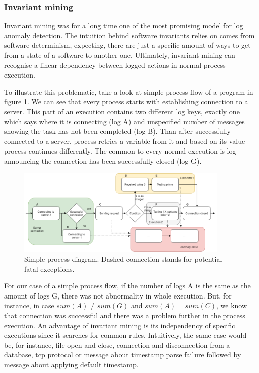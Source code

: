 \subsubsection{Invariant mining}

Invariant mining was for a long time one of the most promising model for log anomaly detection. The intuition behind software invariants relies on comes from software determinism, expecting, there are just a specific amount of ways to get from a state of a software to another one. Ultimately, invariant mining can recognise a linear dependency between logged actions in normal process execution.

To illustrate this problematic, take a look at simple process flow of a program in figure \ref{fig:sota_invMining_simpleProcess}. We can see that every process starts with establishing connection to a server. This part of an execution contains two different log keys, exactly one which says where it is connecting (log A) and unspecified number of messages showing the task has not been completed (log B). Than after successfully connected to a server, process retries a variable from it and based on its value process continues differently. The common to every normal execution is log announcing the connection has been successfully closed (log G).

\begin{figure}[h]
    \centering
    \includegraphics[width=0.9\textwidth]{figures/stateOfTheArt/simpleProcessWorkflow.png}
    \caption{Simple process diagram. Dashed connection stands for potential fatal exceptions.}
    \label{fig:sota_invMining_simpleProcess}
\end{figure}

For our case of a simple process flow, if the number of logs A is the same as the amount of logs G, there was not abnormality in whole execution. But, for instance, in case $sum(A) \neq sum(G)$ and $sum(A) = sum(C)$, we know that connection was successful and there was a problem further in the process execution. An advantage of invariant mining is its independency of specific executions since it searches for common rules. Intuitively, the same case would be, for instance, file open and close, connection and disconnection from a database, tcp protocol or message about timestamp parse failure followed by message about applying default timestamp. 

